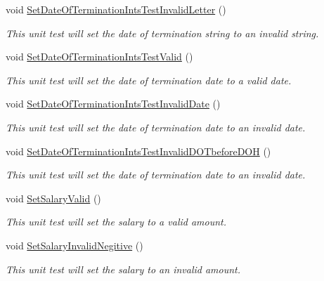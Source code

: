 \begin{DoxyCompactItemize}
void \hyperlink{class_my_all_employee_1_1_tests_1_1_full_time_employee_tests_a2100cd2012516442a8f0135ad758267b}{Set\+Date\+Of\+Termination\+Ints\+Test\+Invalid\+Letter} ()
\begin{DoxyCompactList}\small\item\em This unit test will set the date of termination string to an invalid string. \end{DoxyCompactList}\item 
void \hyperlink{class_my_all_employee_1_1_tests_1_1_full_time_employee_tests_a8810d067a646db92115915a1181888cb}{Set\+Date\+Of\+Termination\+Ints\+Test\+Valid} ()
\begin{DoxyCompactList}\small\item\em This unit test will set the date of termination date to a valid date. \end{DoxyCompactList}\item 
void \hyperlink{class_my_all_employee_1_1_tests_1_1_full_time_employee_tests_a52a133fb150a8b978bb8b39034b9edb3}{Set\+Date\+Of\+Termination\+Ints\+Test\+Invalid\+Date} ()
\begin{DoxyCompactList}\small\item\em This unit test will set the date of termination date to an invalid date. \end{DoxyCompactList}\item 
void \hyperlink{class_my_all_employee_1_1_tests_1_1_full_time_employee_tests_aaef78168b1212d495fd9dd261218487c}{Set\+Date\+Of\+Termination\+Ints\+Test\+Invalid\+D\+O\+Tbefore\+D\+O\+H} ()
\begin{DoxyCompactList}\small\item\em This unit test will set the date of termination date to an invalid date. \end{DoxyCompactList}\item 
void \hyperlink{class_my_all_employee_1_1_tests_1_1_full_time_employee_tests_aaf653ba9d0ad74069bd6b697750c142d}{Set\+Salary\+Valid} ()
\begin{DoxyCompactList}\small\item\em This unit test will set the salary to a valid amount. \end{DoxyCompactList}\item 
void \hyperlink{class_my_all_employee_1_1_tests_1_1_full_time_employee_tests_acfd54f1cbd28f37eba05ddfc119ac203}{Set\+Salary\+Invalid\+Negitive} ()
\begin{DoxyCompactList}\small\item\em This unit test will set the salary to an invalid amount. \end{DoxyCompactList}\end{DoxyCompactItemize}


